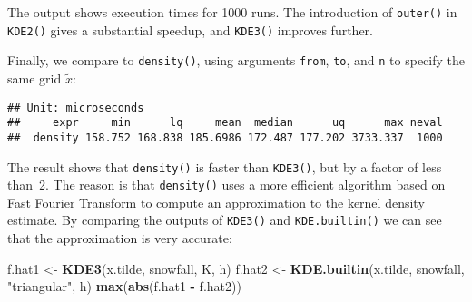 \documentclass[
  a4paper,
]{article}
\newenvironment{Shaded}{\begin{snugshade}}{\end{snugshade}}
\newcommand{\AttributeTok}[1]{\textcolor[rgb]{0.13,0.29,0.53}{#1}}
\newcommand{\ControlFlowTok}[1]{\textcolor[rgb]{0.13,0.29,0.53}{\textbf{#1}}}
\newcommand{\DecValTok}[1]{\textcolor[rgb]{0.00,0.00,0.81}{#1}}
\newcommand{\FunctionTok}[1]{\textcolor[rgb]{0.13,0.29,0.53}{\textbf{#1}}}
\newcommand{\NormalTok}[1]{#1}
\newcommand{\OtherTok}[1]{\textcolor[rgb]{0.56,0.35,0.01}{#1}}
\newcommand{\SpecialCharTok}[1]{\textcolor[rgb]{0.81,0.36,0.00}{\textbf{#1}}}
\newcommand{\StringTok}[1]{\textcolor[rgb]{0.31,0.60,0.02}{#1}}
\theoremstyle{definition}
\theoremstyle{definition}
\theoremstyle{definition}
\theoremstyle{definition}
\theoremstyle{remark}
\begin{document}
The output shows execution times for 1000 runs. The introduction
of \texttt{outer()} in \texttt{KDE2()} gives a substantial speedup, and \texttt{KDE3()} improves further.

Finally, we compare to \texttt{density()}, using arguments \texttt{from}, \texttt{to}, and \texttt{n}
to specify the same grid \(\tilde x\):

\begin{Shaded}
\end{Shaded}

\begin{verbatim}
## Unit: microseconds
##     expr     min      lq     mean  median      uq      max neval
##  density 158.752 168.838 185.6986 172.487 177.202 3733.337  1000
\end{verbatim}

The result shows that \texttt{density()} is faster than \texttt{KDE3()}, but by a factor
of less than~2. The reason is that \texttt{density()} uses a more efficient
algorithm based on Fast Fourier Transform to compute an approximation to the
kernel density estimate. By comparing the outputs of \texttt{KDE3()} and \texttt{KDE.builtin()}
we can see that the approximation is very accurate:

\begin{Shaded}
\begin{Highlighting}[]
\NormalTok{f.hat1 }\OtherTok{\textless{}{-}} \FunctionTok{KDE3}\NormalTok{(x.tilde, snowfall, K, h)}
\NormalTok{f.hat2 }\OtherTok{\textless{}{-}} \FunctionTok{KDE.builtin}\NormalTok{(x.tilde, snowfall, }\StringTok{"triangular"}\NormalTok{, h)}
\FunctionTok{max}\NormalTok{(}\FunctionTok{abs}\NormalTok{(f.hat1 }\SpecialCharTok{{-}}\NormalTok{ f.hat2))}
\end{Highlighting}
\end{Shaded}
\end{document}
